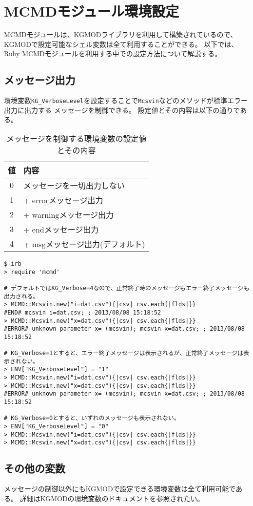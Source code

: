 
%

\section{MCMDモジュール環境設定\label{sect:evnRB}}
MCMDモジュールは、KGMODライブラリを利用して構築されているので、
KGMODで設定可能なシェル変数は全て利用することができる。
以下では、Ruby MCMDモジュールを利用する中での設定方法について解説する。

\subsection{メッセージ出力}

環境変数\verb|KG_VerboseLevel|を設定することで\verb|Mcsvin|などのメソッドが標準エラー出力に出力する
メッセージを制御できる。
設定値とその内容は以下の通りである。

\begin{table}[htpb]
\begin{center}
\caption{メッセージを制御する環境変数の設定値とその内容\label{tb:bench1}}
\begin{tabular}{c|l}
\hline
値  & 内容\\ \hline
0 & メッセージを一切出力しない \\
1 & + errorメッセージ出力 \\
2 & + warningメッセージ出力 \\
3 & + endメッセージ出力 \\
4 & + msgメッセージ出力(デフォルト) \\
\hline
\end{tabular}  
\end{center}
\end{table}  

\begin{Verbatim}[baselinestretch=0.7,frame=single]
$ irb
> require 'mcmd'

# デフォルトではKG_Verbose=4なので、正常終了時のメッセージもエラー終了メッセージも出力される。
> MCMD::Mcsvin.new("i=dat.csv"){|csv| csv.each{|flds|}}
#END# mcsvin i=dat.csv; ; 2013/08/08 15:18:52
> MCMD::Mcsvin.new("x=dat.csv"){|csv| csv.each{|flds|}}
#ERROR# unknown parameter x= (mcsvin); mcsvin x=dat.csv; ; 2013/08/08 15:18:52

# KG_Verbose=1とすると、エラー終了メッセージは表示されるが、正常終了メッセージは表示されない。
> ENV["KG_VerboseLevel"] = "1"
> MCMD::Mcsvin.new("i=dat.csv"){|csv| csv.each{|flds|}}
> MCMD::Mcsvin.new("x=dat.csv"){|csv| csv.each{|flds|}}
#ERROR# unknown parameter x= (mcsvin); mcsvin x=dat.csv; ; 2013/08/08 15:18:52

# KG_Verbose=0とすると、いずれのメッセージも表示されない。
> ENV["KG_VerboseLevel"] = "0"
> MCMD::Mcsvin.new("i=dat.csv"){|csv| csv.each{|flds|}}
> MCMD::Mcsvin.new("x=dat.csv"){|csv| csv.each{|flds|}}
\end{Verbatim}



\subsection{その他の変数}
メッセージの制御以外にもKGMODで設定できる環境変数は全て利用可能である。
詳細はKGMODの環境変数のドキュメントを参照されたい。


